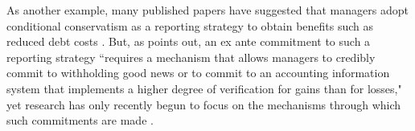 \documentclass[11pt,reqno]{amsart}
\begin{document}
As another example, many published papers have suggested that managers adopt conditional conservatism as a reporting strategy to obtain benefits such as reduced debt costs \citep{Ahmed:2002aa,Zhang:2008bc}.
But, as \citet[p\,317]{Beyer:2010cj} points out, an ex ante commitment to such a reporting strategy ``requires a mechanism that allows managers to credibly commit to withholding good news or to commit to an accounting information system that implements a higher degree of verification for gains than for losses," yet research has only recently begun to focus on the mechanisms through which such commitments are made \citep[e.g.,][]{Erkens:2014hj}.






\end{document}
